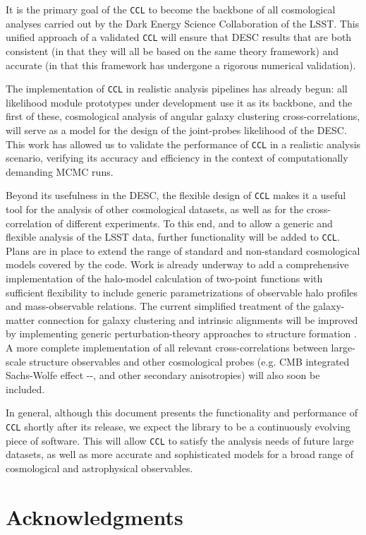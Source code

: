 \documentclass[\docopts]{\docclass}
\newcommand{\damonge}[1]{\textcolor{green!55!blue}{DA: #1}}
\newcommand{\ccl}{{\tt CCL}\xspace}
\begin{document}
It is the primary goal of the \ccl to become the backbone of all cosmological analyses carried out by the Dark Energy Science Collaboration of the LSST. This unified approach of a validated \ccl will ensure that DESC results that are both consistent (in that they will all be based on the same theory framework) and accurate (in that this framework has undergone a rigorous numerical validation).

The implementation of \ccl in realistic analysis pipelines has already begun: all likelihood module prototypes under development use it as its backbone, and the first of these, cosmological analysis of angular galaxy clustering cross-correlations, will serve as a model for the design of the joint-probes likelihood of the DESC. This work has allowed us to validate the performance of \ccl in a realistic analysis scenario, verifying its accuracy and efficiency in the context of computationally demanding MCMC runs. %

Beyond its usefulness in the DESC, the flexible design of \ccl makes it a useful tool for the analysis of other cosmological datasets, as well as for the cross-correlation of different experiments. To this end, and to allow a generic and flexible analysis of the LSST data, further functionality will be added to \ccl. Plans are in place to extend the range of standard and non-standard cosmological models covered by the code. Work is already underway to add a comprehensive implementation of the halo-model calculation of two-point functions \citep{Peacock2000} with sufficient flexibility to include generic parametrizations of observable halo profiles and mass-observable relations. The current simplified treatment of the galaxy-matter connection for galaxy clustering and intrinsic alignments will be improved by implementing generic perturbation-theory approaches to structure formation \citep{2009JCAP...08..020M,FASTPT}. A more complete implementation of all relevant cross-correlations between large-scale structure observables and other cosmological probes (e.g. CMB integrated Sachs-Wolfe effect -\citealt{1967ApJ...147...73S}-, and other secondary anisotropies) will also soon be included. 

In general, although this document presents the functionality and performance of \ccl shortly after its release, we expect the library to be a continuously evolving piece of software. This will allow \ccl to satisfy the analysis needs of future large datasets, as well as more accurate and sophisticated models for a broad range of cosmological and astrophysical observables.

\section*{Acknowledgments}

\vskip 5pt


\vskip 5pt



\end{document}
